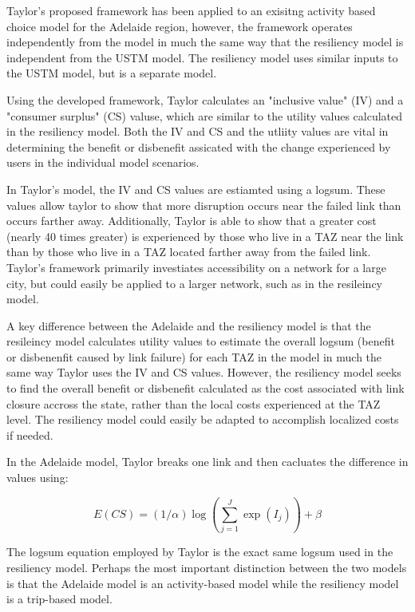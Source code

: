 Taylor's proposed framework has been applied to an exisitng activity based
choice model for the Adelaide region, however, the framework operates
independently from the model in much the same way that the resiliency
model is independent from the USTM model. The resiliency model uses
similar inputs to the USTM model, but is a separate model.

Using the developed framework, Taylor calculates an "inclusive value" (IV)
and a "consumer surplus" (CS) valuse, which are similar to the utility
values calculated in the resiliency model. Both the IV and CS and the
utliity values are vital in determining the benefit or disbenefit
assicated with the change experienced by users in the individual model
scenarios.

In Taylor's model, the IV and CS values are estiamted using a logsum.
These values allow taylor to show that more disruption occurs near the
failed link than occurs farther away. Additionally, Taylor is able to show
that a greater cost (nearly 40 times greater) is experienced by those who
live in a TAZ near the link than by those who live in a TAZ located
farther away from the failed link. Taylor's framework primarily
investiates accessibility on a network for a large city,
but could easily be applied to a larger network, such as in the resileincy
model.

A key difference between the Adelaide and the resiliency model is that the
resileincy model calculates utility values to estimate the overall logsum
(benefit or disbenenfit caused by link failure) for each TAZ in the model
in much the same way Taylor uses the IV and CS values. However, the
resiliency model seeks to find the overall benefit or disbenefit
calculated as the cost associated with link closure accross the state,
rather than the local costs experienced at the TAZ level. The resiliency
model could easily be adapted to accomplish localized costs if needed.

In the Adelaide model, Taylor breaks one link and
then cacluates the difference in values using:

	\begin{equation}
		E(CS) = (1/\alpha) \log (\sum_{j = 1}^{J} \exp (I_j)) + \beta
			\label{eqn:taylor}
	\end{equation}

The logsum equation employed by Taylor is the exact same logsum used in
the resiliency model. Perhaps the most important distinction between the
two models is that the Adelaide model is an activity-based model while the
resiliency model is a trip-based model.

